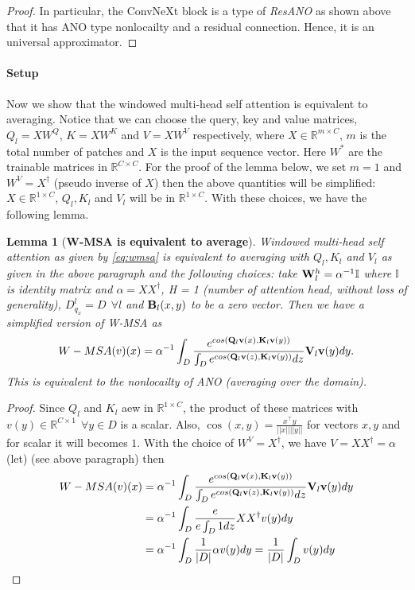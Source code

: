 \documentclass[reqno,10pt]{amsart}
\theoremstyle{plain}
\newtheorem{lem}{Lemma}
\theoremstyle{definition}
\newcommand{\bb}[1]{\mathbb{#1}}
\begin{document}
\begin{proof}
    \noindent In particular, the ConvNeXt block is a type of {\it ResANO} as shown above that it has ANO type nonlocailty and a residual connection. Hence, it is an universal approximator.
\end{proof}
\paragraph{\bf Setup} \label{par:setup} Now we show that the windowed multi-head self attention is equivalent to averaging. Notice that we can choose the query, key and value matrices, $Q_l = XW^Q$, $K = XW^K$ and $V = XW^V$ respectively, where $X \in \bb R^{m \times C}$, $m$ is the total number of patches and $X$ is the input sequence vector. Here $W^*$ are the trainable matrices in $\bb R^{C\times C}$. For the proof of the lemma below, we set $m = 1$ and $W^V = X^\dag$ (pseudo inverse of $X$) then the above quantities will be simplified: $X \in \bb R^{1\times C}$, $Q_l, K_l$ and $V_l$ will be in $\bb R^{1\times C}$. With these choices, we have the following lemma.
\begin{lem}[{\bf W-MSA is equivalent to average}]\label{lem:wmsa}
    Windowed multi-head self attention as given by \ref{eq:wmsa} is equivalent to averaging with $Q_l, K_l$ and $V_l$ as given in the above paragraph and the following choices: take ${\bf W}^h_l = \alpha^{-1}\bb I$ where $\bb I$ is identity matrix and $\alpha = XX^\dag$, H = 1 (number of attention head, without loss of generality), $D^l_{q_x} = D~~ \forall l$ and ${\bf B}_l(x,y)$ to be a zero vector. Then we have a simplified version of W-MSA as
    $$W-MSA(v)(x) = \alpha^{-1}\int_{D} \frac{e^{cos({\bf Q}_l {\bf v}(x),{\bf K}_l {\bf v}(y))}}{\int_{D} e^{cos({\bf Q}_l {\bf v}(z),{\bf K}_l {\bf v}(y))}dz} {\bf V}_l {\bf v}(y) dy.$$
    This is equivalent to the nonlocailty of ANO (averaging over the domain).
\end{lem}
\begin{proof}
    Since $Q_l$ and $K_l$ aew in $\bb R^{1\times C}$, the product of these matrices with $v(y) \in \bb R^{C\times 1} ~~\forall y \in D$ is a scalar. Also, $\cos(x,y) = \frac{x^\top y}{||x|| ||y||}$ for vectors $x,y$ and for scalar it will becomes $1$. With the choice of $W^V = X^\dag$, we have $V = XX^\dag = \alpha$ (let) (see above paragraph) then
    \begin{equation*}
        \begin{aligned}
            W-MSA(v)(x) &= \alpha^{-1}\int_{D} \frac{e^{cos({\bf Q}_l {\bf v}(x),{\bf K}_l {\bf v}(y))}}{\int_{D} e^{cos({\bf Q}_l {\bf v}(z),{\bf K}_l {\bf v}(y))}dz} {\bf V}_l {\bf v}(y) dy \\
            &= \alpha^{-1}\int_{D} \frac{e}{e\int_{D}1 dz} XX^\dag v(y) dy \\
            &= \alpha^{-1}\int_{D} \frac{1}{|D|} \alpha v(y) dy = \frac{1}{|D|}\int_{D} v(y) dy\\
        \end{aligned}
    \end{equation*}
\end{proof}
\end{document}
